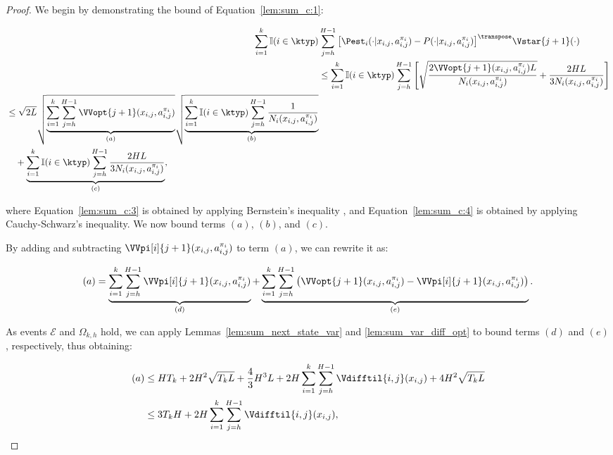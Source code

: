 \begin{proof}
We begin by demonstrating the bound of Equation~\eqref{lem:sum_c:1}:

\begin{align}
    \sum_{i=1}^k \mathbb{I}(i \in \ktyp) &\sum_{j=h}^{H-1} \big[ \Pest_i(\cdot | x_{i,j}, a_{i,j}^{\pi_i}) - P(\cdot | x_{i,j}, a_{i,j}^{\pi_i}) \big]^\transpose \Vstar{j+1}(\cdot) \nonumber \\
    &\le \sum_{i=1}^k \mathbb{I}(i \in \ktyp) \sum_{j=h}^{H-1} \left[ \sqrt{\frac{2 \VVopt{j+1}(x_{i,j}, a_{i,j}^{\pi_i}) L}{N_i (x_{i,j}, a_{i,j}^{\pi_i})}} + \frac{2HL}{3N_i(x_{i,j}, a_{i,j}^{\pi_i})} \right] \label{lem:sum_c:3} \\
    \begin{split}
    \label{lem:sum_c:4}
        &\le \sqrt{2L} \sqrt{\underbrace{\sum_{i=1}^k \sum_{j=h}^{H-1} \VVopt{j+1}(x_{i,j}, a_{i,j}^{\pi_i})}_{(a)}} \sqrt{\underbrace{\sum_{i=1}^k \mathbb{I}(i \in \ktyp) \sum_{j=h}^{H-1} \frac{1}{N_i (x_{i,j}, a_{i,j}^{\pi_i})}}_{(b)}} \\
        &\quad + \underbrace{\sum_{i=1}^k \mathbb{I}(i \in \ktyp) \sum_{j=h}^{H-1} \frac{2HL}{3 N_i (x_{i,j}, a_{i,j}^{\pi_i})}}_{(c)},
    \end{split}
\end{align}

where Equation~\eqref{lem:sum_c:3} is obtained by applying Bernstein's inequality \citep[see, \eg][]{cesabianchi2006}, and Equation~\eqref{lem:sum_c:4} is obtained by applying Cauchy-Schwarz's inequality. We now bound terms $(a)$, $(b)$, and $(c)$.

By adding and subtracting $\VVpi[i]{j+1}(x_{i,j},a_{i,j}^{\pi_i})$ to term $(a)$, we can rewrite it as:

\begin{equation*}
    (a) = \underbrace{\sum_{i=1}^k \sum_{j=h}^{H-1} \VVpi[i]{j+1}(x_{i,j}, a_{i,j}^{\pi_i})}_{(d)} + \underbrace{\sum_{i=1}^k \sum_{j=h}^{H-1} \left( \VVopt{j+1}(x_{i,j},a_{i,j}^{\pi_i}) -  \VVpi[i]{j+1} (x_{i,j},a_{i,j}^{\pi_i}) \right)}_{(e)}.
\end{equation*}

As events $\mathcal{E}$ and $\Omega_{k,h}$ hold, we can apply Lemmas~\ref{lem:sum_next_state_var} and \ref{lem:sum_var_diff_opt} to bound terms $(d)$ and $(e)$, respectively, thus obtaining: 

\begin{align}
    (a) &\le H T_k + 2 H^2 \sqrt{T_k L} + \frac{4}{3} H^3 L + 2 H \sum_{i=1}^k \sum_{j=h}^{H-1} \Vdifftil{i,j}(x_{i,j}) + 4 H^2 \sqrt{T_k L} \nonumber \\
    &\le 3 T_k H + 2 H \sum_{i=1}^k \sum_{j=h}^{H-1} \Vdifftil{i,j}(x_{i,j}), \label{lem:sum_c:5}
\end{align}


\end{proof}
